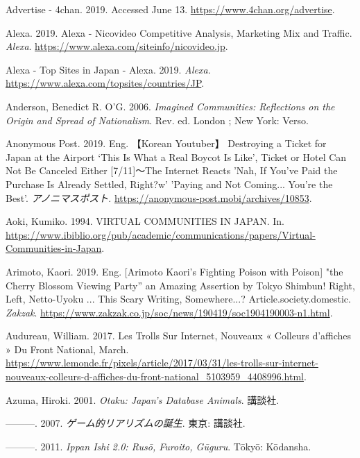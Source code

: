 \documentclass[10pt,british,A4paper,,openany]{memoir}
\begin{document}
\hypertarget{ref-noauthor_advertise_nodate}{}
Advertise - 4chan. 2019. Accessed June 13.
\url{https://www.4chan.org/advertise}.

\hypertarget{ref-alexa_alexa_2019}{}
Alexa. 2019. Alexa - Nicovideo Competitive Analysis, Marketing Mix and
Traffic. \emph{Alexa}.
\url{https://www.alexa.com/siteinfo/nicovideo.jp}.

\hypertarget{ref-noauthor_alexa_2019}{}
Alexa - Top Sites in Japan - Alexa. 2019. \emph{Alexa}.
\url{https://www.alexa.com/topsites/countries/JP}.

\hypertarget{ref-anderson_imagined_2006}{}
Anderson, Benedict R. O'G. 2006. \emph{Imagined Communities: Reflections
on the Origin and Spread of Nationalism}. Rev. ed. London ; New York:
Verso.

\hypertarget{ref-anonymous_post_eng._2019}{}
Anonymous Post. 2019. Eng. 【Korean Youtuber】 Destroying a Ticket for
Japan at the Airport `This Is What a Real Boycot Is Like', Ticket or
Hotel Can Not Be Canceled Either {[}7/11{]}～The Internet Reacts 'Nah,
If You've Paid the Purchase Is Already Settled, Right?w' 'Paying and Not
Coming... You're the Best'. \emph{アノニマスポスト}.
\url{https://anonymous-post.mobi/archives/10853}.

\hypertarget{ref-aoki_virtual_1994}{}
Aoki, Kumiko. 1994. VIRTUAL COMMUNITIES IN JAPAN. In.
\url{https://www.ibiblio.org/pub/academic/communications/papers/Virtual-Communities-in-Japan}.

\hypertarget{ref-arimoto_eng._2019}{}
Arimoto, Kaori. 2019. Eng. {[}Arimoto Kaori's Fighting Poison with
Poison{]} "the Cherry Blossom Viewing Party'' an Amazing Assertion by
Tokyo Shimbun! Right, Left, Netto-Uyoku ... This Scary Writing,
Somewhere...? Article.society.domestic. \emph{Zakzak}.
\url{https://www.zakzak.co.jp/soc/news/190419/soc1904190003-n1.html}.

\hypertarget{ref-audureau_les_2017}{}
Audureau, William. 2017. Les Trolls Sur Internet, Nouveaux « Colleurs
d'affiches » Du Front National, March.
\url{https://www.lemonde.fr/pixels/article/2017/03/31/les-trolls-sur-internet-nouveaux-colleurs-d-affiches-du-front-national_5103959_4408996.html}.

\hypertarget{ref-azuma_otaku:_2001}{}
Azuma, Hiroki. 2001. \emph{Otaku: Japan's Database Animals}. 講談社.

\hypertarget{ref-azuma__2007}{}
---------. 2007. \emph{ゲーム的リアリズムの誕生}. 東京: 講談社.

\hypertarget{ref-azuma_ippan_2011}{}
---------. 2011. \emph{Ippan Ishi 2.0: Rusō, Furoito, Gūguru}. Tōkyō:
Kōdansha.
\end{document}
